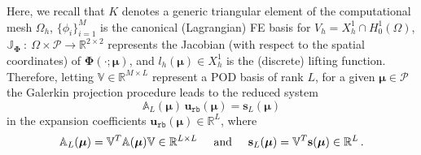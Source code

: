 \documentclass[12pt, a4paper, twoside, openright, notitlepage]{report}
\numberwithin{equation}{chapter}
\theoremstyle{theorem}
\theoremstyle{definition}
\theoremstyle{remark}
\theoremstyle{proposition}
\numberwithin{figure}{chapter}
\newcommand{\bg}[1]{\boldsymbol{#1}}
\begin{document}
		Here, we recall that $K$ denotes a generic triangular element of the computational mesh $\Omega_h$, $\big\lbrace \phi_i \big\rbrace_{i = 1}^M$ is the canonical (Lagrangian) FE basis for $V_h = X_h^1 \cap H_0^1(\Omega)$, $\mathbb{J}_{\bg{\Phi}} ~ : ~ \Omega \times \mathcal{P} \rightarrow \mathbb{R}^{2 \times 2}$ represents the Jacobian (with respect to the spatial coordinates) of $\bg{\Phi}(\cdot; \bg{\mu})$, and $l_h(\bg{\mu}) \in X_h^1$ is the (discrete) lifting function. Therefore, letting $\mathbb{V} \in \mathbb{R}^{M \times L}$ represent a POD basis of rank $L$, for a given $\bg{\mu} \in \mathcal{P}$ the Galerkin projection procedure leads to the reduced system
		\begin{equation*}
			\label{eq:poisson2d-1-podg-system}
			\mathbb{A}_L(\bg{\mu}) \, \mathbf{u}_{\texttt{rb}}(\bg{\mu}) = \mathbf{s}_L(\bg{\mu})
		\end{equation*}
		in the expansion coefficients $\mathbf{u}_{\texttt{rb}}(\bg{\mu}) \in \mathbb{R}^L$, where
		\begin{equation*}
			\label{eq:poisson2d-1-podg-matrices}
			\mathbb{A}_L(\bg{\mu}) = \mathbb{V}^T \mathbb{A}(\bg{\mu}) \mathbb{V} \in \mathbb{R}^{L \times L} \hspace*{0.5cm} \text{and} \hspace*{0.5cm} \mathbf{s}_L(\bg{\mu}) = \mathbb{V}^T \mathbf{s}(\bg{\mu}) \in \mathbb{R}^L \, .
		\end{equation*}
\end{document}
